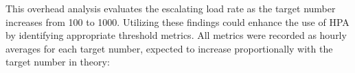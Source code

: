 This overhead analysis evaluates the escalating load rate as the target number increases from 100 to 1000. Utilizing these findings could enhance the use of \ac{HPA} by identifying appropriate threshold metrics. All metrics were recorded as hourly averages for each target number, expected to increase proportionally with the target number in theory: 

\begin{figure}[htpb]
  \centering
  \cpuA
  \cpuB
  \memA
  \pgfplotstableread{
}
\end{figure}
